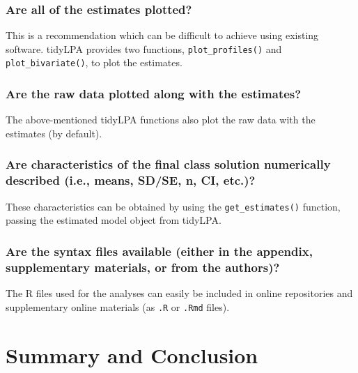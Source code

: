 \documentclass[man]{apa6}
\begin{document}
\hypertarget{are-all-of-the-estimates-plotted}{%
\subsubsection{Are all of the estimates plotted?}\label{are-all-of-the-estimates-plotted}}

This is a recommendation which can be difficult to achieve using existing software. tidyLPA provides two functions, \texttt{plot\_profiles()} and \texttt{plot\_bivariate()}, to plot the estimates.

\hypertarget{are-the-raw-data-plotted-along-with-the-estimates}{%
\subsubsection{Are the raw data plotted along with the estimates?}\label{are-the-raw-data-plotted-along-with-the-estimates}}

The above-mentioned tidyLPA functions also plot the raw data with the estimates (by default).

\hypertarget{are-characteristics-of-the-final-class-solution-numerically-described-i.e.-means-sdse-n-ci-etc.}{%
\subsubsection{Are characteristics of the final class solution numerically described (i.e., means, SD/SE, n, CI, etc.)?}\label{are-characteristics-of-the-final-class-solution-numerically-described-i.e.-means-sdse-n-ci-etc.}}

These characteristics can be obtained by using the \texttt{get\_estimates()} function, passing the estimated model object from tidyLPA.

\hypertarget{are-the-syntax-files-available-either-in-the-appendix-supplementary-materials-or-from-the-authors}{%
\subsubsection{Are the syntax files available (either in the appendix, supplementary materials, or from the authors)?}\label{are-the-syntax-files-available-either-in-the-appendix-supplementary-materials-or-from-the-authors}}

The R files used for the analyses can easily be included in online repositories and supplementary online materials (as \texttt{.R} or \texttt{.Rmd} files).

\hypertarget{summary-and-conclusion}{%
\section{Summary and Conclusion}\label{summary-and-conclusion}}
\end{document}
